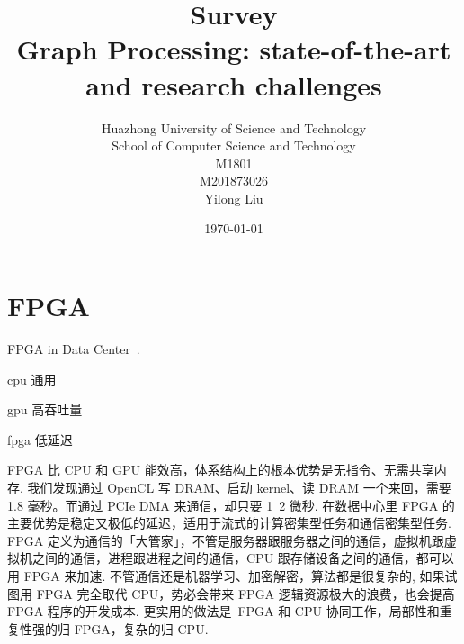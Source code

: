 \documentclass[UTF8,12pt,a4paper]{article}
\title{Survey \\ \bigskip \textbf{Graph Processing: state-of-the-art and research challenges}}
\author{Huazhong University of Science and Technology\\ School of Computer Science and Technology\\ M1801\\ M201873026\\ Yilong Liu}
\date{\today}
\begin{document}
\maketitle
\newpage


\tableofcontents
\newpage


\section{FPGA}

FPGA in Data Center~\cite{DBLP:conf/isca/PutnamCCCCDEFGGHHHHKLLPPSTXB14}.

\begin{compactitem}
  \item cpu 通用
  \item gpu 高吞吐量
  \item fpga 低延迟
\end{compactitem}

FPGA 比 CPU 和 GPU 能效高，体系结构上的根本优势是无指令、无需共享内存.
我们发现通过 OpenCL 写 DRAM、启动 kernel、读 DRAM 一个来回，需要 1.8 毫秒。而通过 PCIe DMA 来通信，却只要 1~2 微秒.
在数据中心里 FPGA 的主要优势是稳定又极低的延迟，适用于流式的计算密集型任务和通信密集型任务.
FPGA 定义为通信的「大管家」，不管是服务器跟服务器之间的通信，虚拟机跟虚拟机之间的通信，进程跟进程之间的通信，CPU 跟存储设备之间的通信，都可以用 FPGA 来加速.
不管通信还是机器学习、加密解密，算法都是很复杂的,
如果试图用 FPGA 完全取代 CPU，势必会带来 FPGA 逻辑资源极大的浪费，也会提高 FPGA 程序的开发成本.
更实用的做法是 FPGA 和 CPU 协同工作，局部性和重复性强的归 FPGA，复杂的归 CPU.

\clearpage

\end{document}
